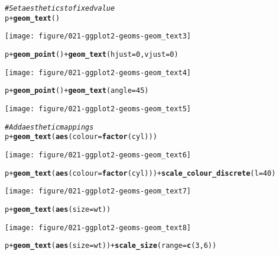 \documentclass[a4paper,titlepage]{tufte-handout}\usepackage[]{graphicx}\usepackage[]{color}
\makeatletter
\def\maxwidth{ %
  \ifdim\Gin@nat@width>\linewidth
    \linewidth
  \else
    \Gin@nat@width
  \fi
}
\newcommand{\hlnum}[1]{\textcolor[rgb]{0.686,0.059,0.569}{#1}}%
\newcommand{\hlcom}[1]{\textcolor[rgb]{0.678,0.584,0.686}{\textit{#1}}}%
\newcommand{\hlopt}[1]{\textcolor[rgb]{0,0,0}{#1}}%
\newcommand{\hlstd}[1]{\textcolor[rgb]{0.345,0.345,0.345}{#1}}%
\newcommand{\hlkwc}[1]{\textcolor[rgb]{0.333,0.667,0.333}{#1}}%
\newcommand{\hlkwd}[1]{\textcolor[rgb]{0.737,0.353,0.396}{\textbf{#1}}}%
\newenvironment{kframe}{%
 \def\at@end@of@kframe{}%
 \ifinner\ifhmode%
  \def\at@end@of@kframe{\end{minipage}}%
  \begin{minipage}{\columnwidth}%
 \fi\fi%
 \def\FrameCommand##1{\hskip\@totalleftmargin \hskip-\fboxsep
 \colorbox{shadecolor}{##1}\hskip-\fboxsep
     \hskip-\linewidth \hskip-\@totalleftmargin \hskip\columnwidth}%
 \MakeFramed {\advance\hsize-\width
   \@totalleftmargin\z@ \linewidth\hsize
   \@setminipage}}%
 {\par\unskip\endMakeFramed%
 \at@end@of@kframe}
\newenvironment{knitrout}{}{} %
\makeatother
\begin{document}
\begin{knitrout}
\begin{kframe}
\begin{alltt}
\hlcom{# Set aesthetics to fixed value}
\hlstd{p} \hlopt{+} \hlkwd{geom_text}\hlstd{()}
\end{alltt}
\end{kframe}
\texttt{[image: figure/021-ggplot2-geoms-geom\_text3]} 
\begin{kframe}\begin{alltt}
\hlstd{p} \hlopt{+} \hlkwd{geom_point}\hlstd{()} \hlopt{+} \hlkwd{geom_text}\hlstd{(}\hlkwc{hjust}\hlstd{=}\hlnum{0}\hlstd{,} \hlkwc{vjust}\hlstd{=}\hlnum{0}\hlstd{)}
\end{alltt}
\end{kframe}
\texttt{[image: figure/021-ggplot2-geoms-geom\_text4]} 
\begin{kframe}\begin{alltt}
\hlstd{p} \hlopt{+} \hlkwd{geom_point}\hlstd{()} \hlopt{+} \hlkwd{geom_text}\hlstd{(}\hlkwc{angle} \hlstd{=} \hlnum{45}\hlstd{)}
\end{alltt}
\end{kframe}
\texttt{[image: figure/021-ggplot2-geoms-geom\_text5]} 
\begin{kframe}\begin{alltt}
\hlcom{# Add aesthetic mappings}
\hlstd{p} \hlopt{+} \hlkwd{geom_text}\hlstd{(}\hlkwd{aes}\hlstd{(}\hlkwc{colour}\hlstd{=}\hlkwd{factor}\hlstd{(cyl)))}
\end{alltt}
\end{kframe}
\texttt{[image: figure/021-ggplot2-geoms-geom\_text6]} 
\begin{kframe}\begin{alltt}
\hlstd{p} \hlopt{+} \hlkwd{geom_text}\hlstd{(}\hlkwd{aes}\hlstd{(}\hlkwc{colour}\hlstd{=}\hlkwd{factor}\hlstd{(cyl)))} \hlopt{+} \hlkwd{scale_colour_discrete}\hlstd{(}\hlkwc{l}\hlstd{=}\hlnum{40}\hlstd{)}
\end{alltt}
\end{kframe}
\texttt{[image: figure/021-ggplot2-geoms-geom\_text7]} 
\begin{kframe}\begin{alltt}
\hlstd{p} \hlopt{+} \hlkwd{geom_text}\hlstd{(}\hlkwd{aes}\hlstd{(}\hlkwc{size}\hlstd{=wt))}
\end{alltt}
\end{kframe}
\texttt{[image: figure/021-ggplot2-geoms-geom\_text8]} 
\begin{kframe}\begin{alltt}
\hlstd{p} \hlopt{+} \hlkwd{geom_text}\hlstd{(}\hlkwd{aes}\hlstd{(}\hlkwc{size}\hlstd{=wt))} \hlopt{+} \hlkwd{scale_size}\hlstd{(}\hlkwc{range}\hlstd{=}\hlkwd{c}\hlstd{(}\hlnum{3}\hlstd{,}\hlnum{6}\hlstd{))}

\end{alltt}
\end{kframe}
\end{knitrout}
\end{document}
